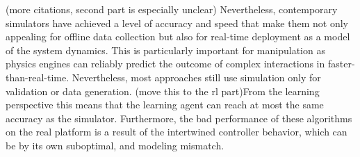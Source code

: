(more citations, second part is especially unclear)
Nevertheless, contemporary simulators have achieved a level of accuracy and speed that make them not only appealing for offline data collection but also for real-time deployment as a model of the system dynamics. This is particularly important for manipulation as physics engines can reliably predict the outcome of complex interactions in faster-than-real-time. Nevertheless, most approaches still use simulation only for validation or data generation. (move this to the rl part)From the learning perspective this means that the learning agent can reach at most the same accuracy as the simulator. Furthermore, the bad performance of these algorithms on the real platform is a result of the intertwined controller behavior, which can be by its own suboptimal, and modeling mismatch.   
